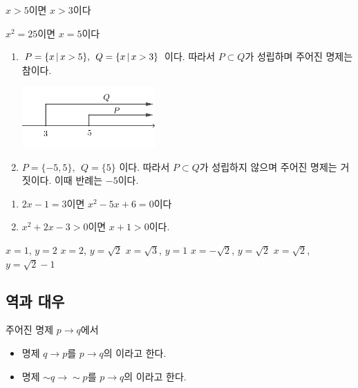 \documentclass{oblivoir}
\begin{document}
%
\begin{enumerate*}[itemjoin={,\qquad\qquad}]\label{pq3}
\item
\(x>5\)이면 \(x>3\)이다
\item
\(x^2=25\)이면 \(x=5\)이다
\end{enumerate*}
\begin{mdframed}
\begin{enumerate}
\item
\(P=\{x\,|\, x>5\},\:\: Q=\{x\,|\, x>3\}\)
이다.
따라서 \(P\subset Q\)가 성립하며 주어진 명제는 참이다.
\begin{center}
\includegraphics[width=0.4\textwidth]{pq_3}
\end{center}
\item
\(P=\{-5,5\},\:\: Q=\{5\}\)
이다.
따라서 \(P\subset Q\)가 성립하지 않으며 주어진 명제는 거짓이다.
이때 반례는 \(-5\)이다.
\end{enumerate}
\end{mdframed}

%
\begin{enumerate}%
\label{pq4}
\item
\(2x-1=3\)이면 \(x^2-5x+6=0\)이다
\item
\(x^2+2x-3>0\)이면 \(x+1>0\)이다.
\end{enumerate}

%
\label{pq5}
\vspace{-20pt}
\tabb
{\(x=1\), \(y=2\)}
{\(x=2\), \(y=\sqrt2\)}
{\(x=\sqrt3\), \(y=1\)}
{\(x=-\sqrt2\), \(y=\sqrt2\)}
{\(x=\sqrt2\), \(y=\sqrt2-1\)}
\newpage

\subsection{역과 대우}
\begin{mdframed}
%
\label{pq6}
주어진 명제 \(p\to q\)에서
\begin{itemize}
\item
명제 \(q\to p\)를 \(p\to q\)의 이라고 한다.
\item
명제 \(\sim q\to\sim p\)를 \(p\to q\)의 이라고 한다.
\end{itemize}
\end{mdframed}
\end{document}
